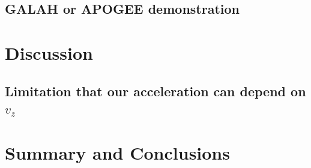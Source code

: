 \subsection{GALAH or APOGEE demonstration}
\label{sec:gaiadr3}


\section{Discussion} \label{sec:discussion}

\subsection{Limitation that our acceleration can depend on $v_z$}


\section{Summary and Conclusions} \label{sec:conclusions}



